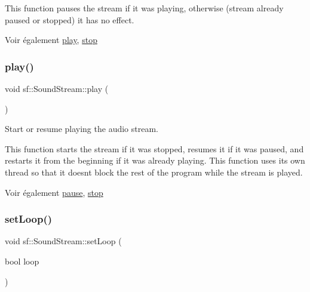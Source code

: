 This function pauses the stream if it was playing, otherwise (stream already paused or stopped) it has no effect.

\begin{DoxySeeAlso}{Voir également}
\hyperlink{classsf_1_1SoundStream_afdc08b69cab5f243d9324940a85a1144}{play}, \hyperlink{classsf_1_1SoundStream_a16cc6a0404b32e42c4dce184bb94d0f4}{stop} 
\end{DoxySeeAlso}
\mbox{\label{classsf_1_1SoundStream_afdc08b69cab5f243d9324940a85a1144}} 
\subsubsection{\texorpdfstring{play()}{play()}}
{\footnotesize\ttfamily void sf\+::\+Sound\+Stream\+::play (\begin{DoxyParamCaption}{ }\end{DoxyParamCaption})}



Start or resume playing the audio stream. 

This function starts the stream if it was stopped, resumes it if it was paused, and restarts it from the beginning if it was already playing. This function uses its own thread so that it doesn\textquotesingle{}t block the rest of the program while the stream is played.

\begin{DoxySeeAlso}{Voir également}
\hyperlink{classsf_1_1SoundStream_a932ff181e661503cad288b4bb6fe45ca}{pause}, \hyperlink{classsf_1_1SoundStream_a16cc6a0404b32e42c4dce184bb94d0f4}{stop} 
\end{DoxySeeAlso}
\mbox{\label{classsf_1_1SoundStream_a43fade018ffba7e4f847a9f00b353f3d}} 
\subsubsection{\texorpdfstring{set\+Loop()}{setLoop()}}
{\footnotesize\ttfamily void sf\+::\+Sound\+Stream\+::set\+Loop (\begin{DoxyParamCaption}\item[{bool}]{loop }\end{DoxyParamCaption})}



